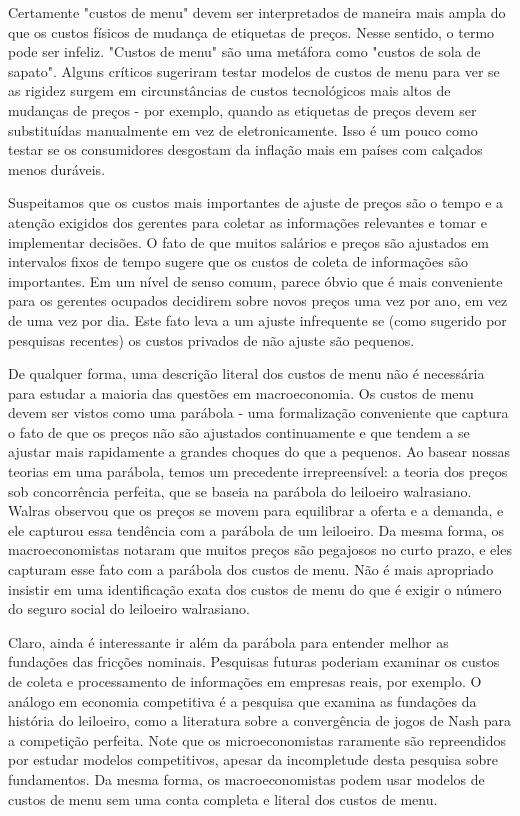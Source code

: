 \documentclass[a4paper,12pt]{article}[abntex2]
\begin{document}
Certamente "custos de menu" devem ser interpretados de maneira mais ampla do que os custos físicos de mudança de etiquetas de preços. Nesse sentido, o termo pode ser infeliz. "Custos de menu" são uma metáfora como "custos de sola de sapato". Alguns críticos sugeriram testar modelos de custos de menu para ver se as rigidez surgem em circunstâncias de custos tecnológicos mais altos de mudanças de preços - por exemplo, quando as etiquetas de preços devem ser substituídas manualmente em vez de eletronicamente. Isso é um pouco como testar se os consumidores desgostam da inflação mais em países com calçados menos duráveis.

Suspeitamos que os custos mais importantes de ajuste de preços são o tempo e a atenção exigidos dos gerentes para coletar as informações relevantes e tomar e implementar decisões. O fato de que muitos salários e preços são ajustados em intervalos fixos de tempo sugere que os custos de coleta de informações são importantes. Em um nível de senso comum, parece óbvio que é mais conveniente para os gerentes ocupados decidirem sobre novos preços uma vez por ano, em vez de uma vez por dia. Este fato leva a um ajuste infrequente se (como sugerido por pesquisas recentes) os custos privados de não ajuste são pequenos.

De qualquer forma, uma descrição literal dos custos de menu não é necessária para estudar a maioria das questões em macroeconomia. Os custos de menu devem ser vistos como uma parábola - uma formalização conveniente que captura o fato de que os preços não são ajustados continuamente e que tendem a se ajustar mais rapidamente a grandes choques do que a pequenos. Ao basear nossas teorias em uma parábola, temos um precedente irrepreensível: a teoria dos preços sob concorrência perfeita, que se baseia na parábola do leiloeiro walrasiano. Walras observou que os preços se movem para equilibrar a oferta e a demanda, e ele capturou essa tendência com a parábola de um leiloeiro. Da mesma forma, os macroeconomistas notaram que muitos preços são pegajosos no curto prazo, e eles capturam esse fato com a parábola dos custos de menu. Não é mais apropriado insistir em uma identificação exata dos custos de menu do que é exigir o número do seguro social do leiloeiro walrasiano.

Claro, ainda é interessante ir além da parábola para entender melhor as fundações das fricções nominais. Pesquisas futuras poderiam examinar os custos de coleta e processamento de informações em empresas reais, por exemplo. O análogo em economia competitiva é a pesquisa que examina as fundações da história do leiloeiro, como a literatura sobre a convergência de jogos de Nash para a competição perfeita. Note que os microeconomistas raramente são repreendidos por estudar modelos competitivos, apesar da incompletude desta pesquisa sobre fundamentos. Da mesma forma, os macroeconomistas podem usar modelos de custos de menu sem uma conta completa e literal dos custos de menu.
\end{document}
